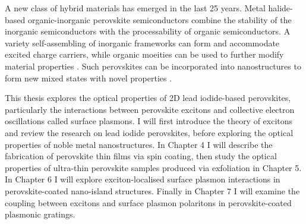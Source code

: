 A new class of hybrid materials has emerged in the last 25 years. Metal halide-based organic-inorganic perovskite semiconductors combine the stability of the inorganic semiconductors with the processability of organic semiconductors. A variety self-assembling of inorganic frameworks can form and accommodate excited charge carriers, while organic moeities can be used to further modify material properties \cite{Cheng2010, Ishihara1990, Mitzi2001, Mitzi2001c, Nagami1996, Pradeesh2010, Pradeesh2009a Lee2012, Heo2013, Liu2013, Hao2014}. Such perovskites can be incorporated into nanostructures to form new mixed states with novel properties \cite{Fujita1998, Fujita1999, Fujita2000, Ishi-Hayase2003, Brehier2006, Lanty2008, Pradeesh2009b, Sumioka2001}.

This thesis explores the optical properties of 2D lead iodide-based perovskites, particularly the interactions between perovskite excitons and collective electron oscillations called surface plasmons. I will first introduce the theory of excitons and review the research on lead iodide perovskites, before exploring the optical properties of noble metal nanostructures. In Chapter 4 I will describe the fabrication of perovskite thin films via spin coating, then study the optical properties of ultra-thin perovskite samples produced via exfoliation in Chapter 5. In Chapter 6 I will explore exciton-localised surface plasmon interactions in perovskite-coated nano-island structures. Finally in Chapter 7 I will examine the coupling between excitons and surface plasmon polaritons in perovskite-coated plasmonic gratings.